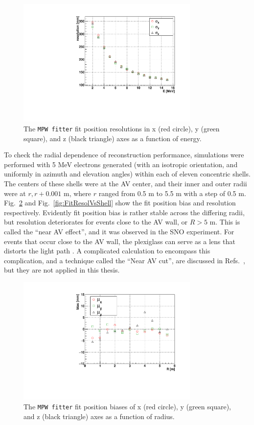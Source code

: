 \begin{figure}[htbp]
	\centering	
	\includegraphics[width=9cm]{MPW_isoFill_posResolVsE.pdf}
	\caption[The \texttt{MPW fitter} fit position resolutions ($\sigma_{x,y,z}$) as a function of energy.]{The \texttt{MPW fitter} fit position resolutions in x (red circle), y (green square), and z (black triangle) axes as a function of energy.}
	\label{fig:MPWposResol_isoFill}
\end{figure}

To check the radial dependence of reconstruction performance, simulations were performed with 5 MeV electrons generated (with an isotropic orientation, and uniformly in azimuth and elevation angles) within each of eleven concentric shells. The centers of these shells were at the AV center, and their inner and outer radii were at $r, r+0.001$ m, where $r$ ranged from 0.5 m to 5.5 m with a step of 0.5 m. Fig.~\ref{fig:FitBiasVsShell} and Fig.~\ref{fig:FitResolVsShell} show the fit position bias and resolution respectively. Evidently fit position bias is rather stable across the differing radii, but resolution deteriorates for events close to the AV wall, or $R>5$ m. This is called the ``near AV effect'', and it was observed in the SNO experiment. For events that occur close to the AV wall, the plexiglass can serve as a lens that distorts the light path \cite{brice1996monte}. A complicated calculation to encompass this complication, and a technique called the ``Near AV cut'', are discussed in Refs.~\cite{coulter2013modelling,jones2011background}, but they are not applied in this thesis. 

\begin{figure}[htbp]
	\centering	
	\includegraphics[width=9cm]{shellTest_RvsBias.pdf}
	\caption[The \texttt{MPW fitter} fit position biases ($\mu_{x,y,z}$) as a function of energies.]{The \texttt{MPW fitter} fit position biases of x (red circle), y (green square), and z (black triangle) axes as a function of radius.}
	\label{fig:FitBiasVsShell}
\end{figure}

